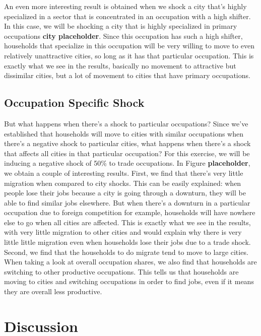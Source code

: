\documentclass[10pt]{article}
\begin{document}
An even more interesting result is obtained when we shock a city that's highly specialized in a sector that is concentrated in an occupation with a high shifter. In this case, we will be shocking a city that is highly specialized in primary occupations \textbf{city placeholder}. Since this occupation has such a high shifter, households that specialize in this occupation will be very willing to move to even relatively unattractive cities, so long as it has that particular occupation. This is exactly what we see in the results, basically no movement to attractive but dissimilar cities, but a lot of movement to cities that have primary occupations.

\subsection{Occupation Specific Shock}

But what happens when there's a shock to particular occupations? Since we've established that households will move to cities with similar occupations when there's a negative shock to particular cities, what happens when there's a shock that affects all cities in that particular occupation? For this exercise, we will be inducing a negative shock of 50\% to trade occupations. In Figure \textbf{placeholder}, we obtain a couple of interesting results. First, we find that there's very little migration when compared to city shocks. This can be easily explained: when people lose their jobs because a city is going through a downturn, they will be able to find similar jobs elsewhere. But when there's a downturn in a particular occupation due to foreign competition for example, households will have nowhere else to go when all cities are affected. This is exactly what we see in the results, with very little migration to other cities and would explain why there is very little little migration even when households lose their jobs due to a trade shock. Second, we find that the households to do migrate tend to move to large cities. When taking a look at overall occupation shares, we also find that households are switching to other productive occupations. This tells us that households are moving to cities and switching occupations in order to find jobs, even if it means they are overall less productive.

\section{Discussion}
\end{document}
